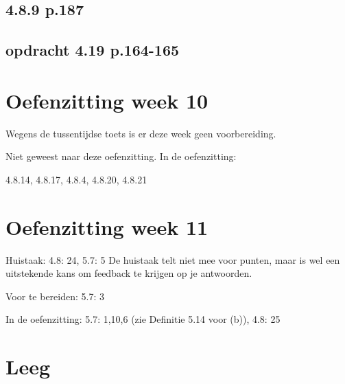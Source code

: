 \documentclass{article}
\begin{document}
\subsection{4.8.9 p.187}

\subsection{opdracht 4.19 p.164-165}

\section{Oefenzitting week 10} 

Wegens de tussentijdse toets is er deze week geen voorbereiding.

Niet geweest naar deze oefenzitting. 
In de oefenzitting: 

4.8.14, 
4.8.17, 
4.8.4, 
4.8.20, 
4.8.21


\section{Oefenzitting week 11}

Huistaak: 
4.8: 24, 5.7: 5 
De huistaak telt niet mee voor punten, maar is wel een uitstekende kans om feedback te krijgen op je antwoorden.

Voor te bereiden: 
5.7: 3

In de oefenzitting: 
5.7: 1,10,6 (zie Definitie 5.14 voor (b)), 4.8: 25



\section{Leeg} 
\end{document}
